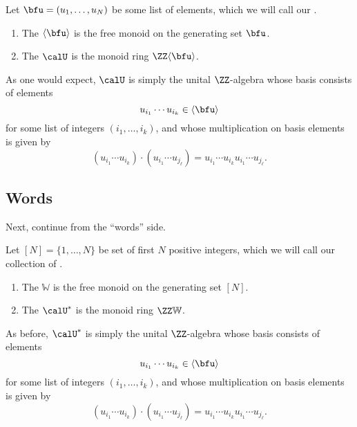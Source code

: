 \documentclass{article}
\begin{document}
\begin{definition}
    \label{def:nc}
    Let $\bfu = (u_1,\ldots,u_N)$ be some list of elements, which we will call our .
    \begin{enumerate}[label=(\alph*)]
        \item 
            \label{def:ncMonomials}
            The  $\langle \bfu \rangle$ is the free monoid on the generating set $\bfu$.
        \item 
            \label{def:FreeAssociativeRing}
            The  $\calU$ is the monoid ring $\ZZ\langle\bfu\rangle$. 
    \end{enumerate}
\end{definition}

As one would expect, $\calU$ is simply the unital $\ZZ$-algebra whose basis consists of elements
\[
    u_{i_1} \cdots u_{i_k} \in \langle \bfu \rangle
\]
for some list of integers $(i_1,\ldots,i_k)$, and whose multiplication on basis elements is given by
\[
    (u_{i_1} \cdots u_{i_k}) \cdot (u_{i_1} \cdots u_{j_\ell})
    =
    u_{i_1} \cdots u_{i_k} u_{i_1} \cdots u_{j_\ell}.
\]

\subsection{Words}

Next, continue from the ``words'' side.

\begin{definition}
    Let $[N] = \{1,\ldots,N\}$ be set of first $N$ positive integers, which we will call our collection of .
    \begin{enumerate}[label=(\alph*)]
        \item 
            The  $\mathbb{W}$ is the free monoid on the generating set $[N]$.
        \item 
            The  $\calU^\ast$ is the monoid ring $\ZZ\mathbb{W}$.
    \end{enumerate}
\end{definition}

As before, $\calU^\ast$ is simply the unital $\ZZ$-algebra whose basis consists of elements
\[
    u_{i_1} \cdots u_{i_k} \in \langle \bfu \rangle
\]
for some list of integers $(i_1,\ldots,i_k)$, and whose multiplication on basis elements is given by
\[
    (u_{i_1} \cdots u_{i_k}) \cdot (u_{i_1} \cdots u_{j_\ell})
    =
    u_{i_1} \cdots u_{i_k} u_{i_1} \cdots u_{j_\ell}.
\]
\end{document}
